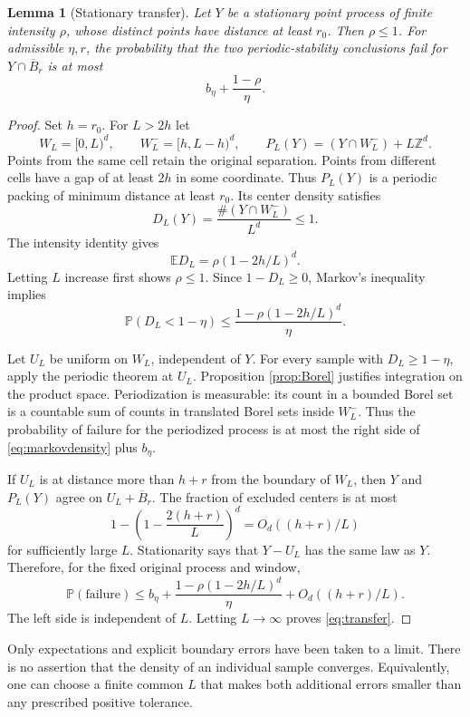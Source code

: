 \documentclass[a4paper,11pt]{article}
\newtheorem{lemma}[theorem]{Lemma}
\theoremstyle{remark}
\numberwithin{equation}{section}
\newcommand{\Z}{\mathbb Z}
\newcommand{\E}{\mathbb E}
\newcommand{\Prob}{\mathbb P}
\begin{document}
\begin{lemma}[Stationary transfer]\label{lem:transfer}
Let $Y$ be a stationary point process of finite intensity $\rho$, whose distinct points have distance at least $r_0$. Then $\rho\le1$. For admissible $\eta,r$, the probability that the two periodic-stability conclusions fail for $Y\cap\overline B_r$ is at most
\begin{equation}
b_\eta+\frac{1-\rho}{\eta}.\label{eq:transfer}
\end{equation}
\end{lemma}
\begin{proof}
Set $h=r_0$. For $L>2h$ let
\[
W_L=[0,L)^d,\qquad W_L^-=[h,L-h)^d,\qquad
P_L(Y)=(Y\cap W_L^-)+L\Z^d.
\]
Points from the same cell retain the original separation. Points from different cells have a gap of at least $2h$ in some coordinate. Thus $P_L(Y)$ is a periodic packing of minimum distance at least $r_0$. Its center density satisfies
\[
D_L(Y)=\frac{\#(Y\cap W_L^-)}{L^d}\le1.
\]
The intensity identity gives
\begin{equation}
\E D_L=\rho(1-2h/L)^d.\label{eq:meandensity}
\end{equation}
Letting $L$ increase first shows $\rho\le1$. Since $1-D_L\ge0$, Markov's inequality implies
\begin{equation}
\Prob(D_L<1-\eta)
\le\frac{1-\rho(1-2h/L)^d}{\eta}.\label{eq:markovdensity}
\end{equation}

Let $U_L$ be uniform on $W_L$, independent of $Y$. For every sample with $D_L\ge1-\eta$, apply the periodic theorem at $U_L$. Proposition \ref{prop:Borel} justifies integration on the product space. Periodization is measurable: its count in a bounded Borel set is a countable sum of counts in translated Borel sets inside $W_L^-$. Thus the probability of failure for the periodized process is at most the right side of \eqref{eq:markovdensity} plus $b_\eta$.

If $U_L$ is at distance more than $h+r$ from the boundary of $W_L$, then $Y$ and $P_L(Y)$ agree on $U_L+\overline B_r$. The fraction of excluded centers is at most
\[
1-\left(1-\frac{2(h+r)}{L}\right)^d=O_d((h+r)/L)
\]
for sufficiently large $L$. Stationarity says that $Y-U_L$ has the same law as $Y$. Therefore, for the fixed original process and window,
\[
\Prob(\mathrm{failure})\le b_\eta+
\frac{1-\rho(1-2h/L)^d}{\eta}+O_d((h+r)/L).
\]
The left side is independent of $L$. Letting $L\to\infty$ proves \eqref{eq:transfer}.
\end{proof}
Only expectations and explicit boundary errors have been taken to a limit. There is no assertion that the density of an individual sample converges. Equivalently, one can choose a finite common $L$ that makes both additional errors smaller than any prescribed positive tolerance.
\end{document}
